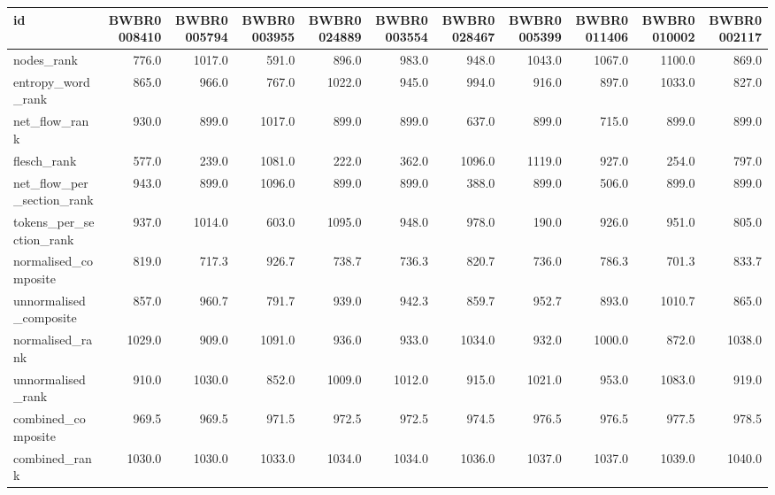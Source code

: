 \begin{tabular}{lrrrrrrrrrr}
\toprule
id & BWBR0008410 & BWBR0005794 & BWBR0003955 & BWBR0024889 & BWBR0003554 & BWBR0028467 & BWBR0005399 & BWBR0011406 & BWBR0010002 & BWBR0002117 \\
\midrule
nodes\_rank & 776.0 & 1017.0 & 591.0 & 896.0 & 983.0 & 948.0 & 1043.0 & 1067.0 & 1100.0 & 869.0 \\
\cline{1-11}
entropy\_word\_rank & 865.0 & 966.0 & 767.0 & 1022.0 & 945.0 & 994.0 & 916.0 & 897.0 & 1033.0 & 827.0 \\
\cline{1-11}
net\_flow\_rank & 930.0 & 899.0 & 1017.0 & 899.0 & 899.0 & 637.0 & 899.0 & 715.0 & 899.0 & 899.0 \\
\cline{1-11}
flesch\_rank & 577.0 & 239.0 & 1081.0 & 222.0 & 362.0 & 1096.0 & 1119.0 & 927.0 & 254.0 & 797.0 \\
\cline{1-11}
net\_flow\_per\_section\_rank & 943.0 & 899.0 & 1096.0 & 899.0 & 899.0 & 388.0 & 899.0 & 506.0 & 899.0 & 899.0 \\
\cline{1-11}
tokens\_per\_section\_rank & 937.0 & 1014.0 & 603.0 & 1095.0 & 948.0 & 978.0 & 190.0 & 926.0 & 951.0 & 805.0 \\
\cline{1-11}
normalised\_composite & 819.0 & 717.3 & 926.7 & 738.7 & 736.3 & 820.7 & 736.0 & 786.3 & 701.3 & 833.7 \\
\cline{1-11}
unnormalised\_composite & 857.0 & 960.7 & 791.7 & 939.0 & 942.3 & 859.7 & 952.7 & 893.0 & 1010.7 & 865.0 \\
\cline{1-11}
normalised\_rank & 1029.0 & 909.0 & 1091.0 & 936.0 & 933.0 & 1034.0 & 932.0 & 1000.0 & 872.0 & 1038.0 \\
\cline{1-11}
unnormalised\_rank & 910.0 & 1030.0 & 852.0 & 1009.0 & 1012.0 & 915.0 & 1021.0 & 953.0 & 1083.0 & 919.0 \\
\cline{1-11}
combined\_composite & 969.5 & 969.5 & 971.5 & 972.5 & 972.5 & 974.5 & 976.5 & 976.5 & 977.5 & 978.5 \\
\cline{1-11}
combined\_rank & 1030.0 & 1030.0 & 1033.0 & 1034.0 & 1034.0 & 1036.0 & 1037.0 & 1037.0 & 1039.0 & 1040.0 \\
\cline{1-11}
\bottomrule
\end{tabular}
